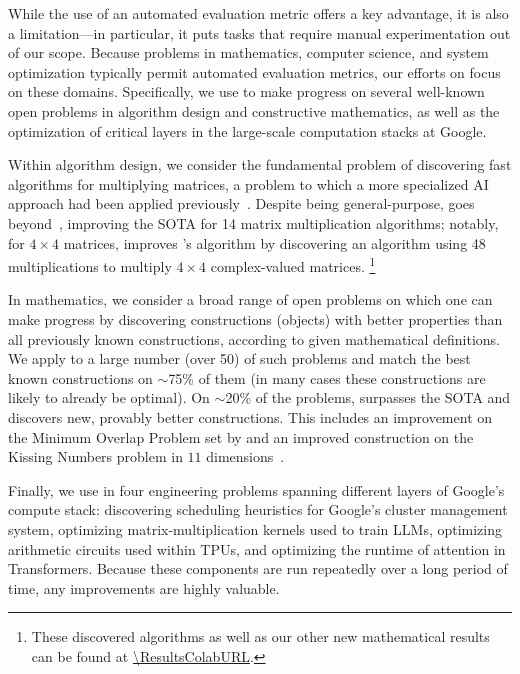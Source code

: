 While the use of an automated evaluation metric offers \method a key advantage, it is also a limitation---in particular, it puts tasks that require manual experimentation out of our scope. 
Because problems in mathematics, computer science, and system optimization typically permit automated evaluation metrics, our efforts on \method focus on these domains.
Specifically, we use \method to make progress on several well-known open problems in algorithm design and constructive mathematics, as well as the optimization of critical layers in the large-scale computation stacks at Google.

Within algorithm design, we consider the fundamental problem of discovering fast algorithms for multiplying matrices, a problem to which a more specialized AI approach had been applied previously~\citep{fawzi2022discovering}.
Despite being general-purpose, \method goes beyond~\cite{fawzi2022discovering}, improving the SOTA for 14 matrix multiplication algorithms; notably, for $4 \times 4$ matrices, \method improves 's algorithm by discovering an algorithm using 48 multiplications to multiply $4 \times 4$ complex-valued matrices.%
\footnote{These discovered algorithms as well as our other new mathematical results can be found at \url{\ResultsColabURL}.}

In mathematics, we consider a broad range of open problems on which one can make progress by discovering constructions (objects) with better properties than all previously known constructions, according to given mathematical definitions.
We apply \method to a large number (over 50) of such problems and match the best known constructions on $\sim$75\% of them (in many cases these constructions are likely to already be optimal). On $\sim$20\% of the problems, \method surpasses the SOTA and discovers new, provably  better constructions.
This includes an improvement on the Minimum Overlap Problem set by \citet{erdHos1955some} and an improved construction on the Kissing Numbers problem in $11$ dimensions~\citep{kissing_survey,kissing_11}.

Finally, we use \method in four engineering problems spanning different layers of Google's compute stack: discovering scheduling heuristics for Google's cluster management system, optimizing matrix-multiplication kernels used to train LLMs, optimizing arithmetic circuits used within TPUs, and optimizing the runtime of attention in Transformers.
Because these components are run repeatedly over a long period of time, any improvements are highly valuable.
